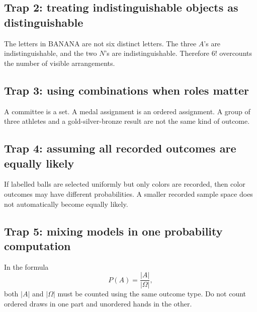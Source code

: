 \subsection*{Trap 2: treating indistinguishable objects as distinguishable}

The letters in \(\text{BANANA}\) are not six distinct letters. The three \(A\)'s are indistinguishable, and the two \(N\)'s are indistinguishable. Therefore \(6!\) overcounts the number of visible arrangements.

\subsection*{Trap 3: using combinations when roles matter}

A committee is a set. A medal assignment is an ordered assignment. A group of three athletes and a gold-silver-bronze result are not the same kind of outcome.

\subsection*{Trap 4: assuming all recorded outcomes are equally likely}

If labelled balls are selected uniformly but only colors are recorded, then color outcomes may have different probabilities. A smaller recorded sample space does not automatically become equally likely.

\subsection*{Trap 5: mixing models in one probability computation}

In the formula
\[
P(A)=\frac{|A|}{|\Omega|},
\]
both \(|A|\) and \(|\Omega|\) must be counted using the same outcome type. Do not count ordered draws in one part and unordered hands in the other.
